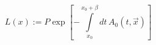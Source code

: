 \begin{equation}
  \label{eq:defpoly}
L(x) := P \exp 
\left[-\int\limits_{x_0}^{x_0+\beta} dt \, A_0(t,\vec x) \right] 
\end{equation}

